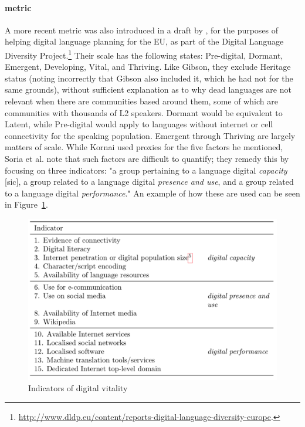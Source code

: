 \paragraph{ metric}

A more recent metric was also introduced in a draft by \citet{soria2017digital}, for the purposes of helping digital language planning for the EU, as part of the Digital Language Diversity Project.\footnote{\href{http://www.dldp.eu/content/reports-digital-language-diversity-europe}{http://www.dldp.eu/content/reports-digital-language-diversity-europe}. } Their scale has the following states: Pre-digital, Dormant, Emergent, Developing, Vital, and Thriving. Like Gibson, they exclude \citet{kornai2013digital} Heritage status (noting incorrectly that Gibson also included it, which he had not for the same grounds), without sufficient explanation as to why dead languages are not relevant when there are communities based around them, some of which are communities with thousands of L2 speakers. Dormant would be equivalent to Latent, while Pre-digital would apply to languages without internet or cell connectivity for the speaking population. Emergent through Thriving are largely matters of scale. While Kornai used proxies for the five factors he mentioned, Soria et al. note that such factors are difficult to quantify; they remedy this by focusing on three indicators: "a group pertaining to a language digital {\it capacity} [sic], a group related to a language digital {\it presence and use}, and a group related to a language digital {\it performance}." \citep[5]{soria2017digital} An example of how these are used can be seen in Figure~\ref{fig:dldp}.

\begin{figure}
 \centering
 \includegraphics[width=1\textwidth]{img/dldp.png}
 \caption{Indicators of digital vitality \citep[6]{soria2017digital}}
 \label{fig:dldp}
\end{figure}

